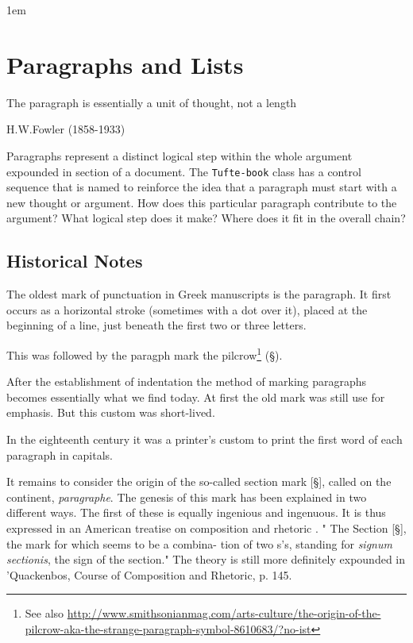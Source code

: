 \parindent1em
          
\chapter{Paragraphs and Lists}

\epigraph{The paragraph is essentially a unit of thought, not a length}{H.W.Fowler (1858-1933)}

\noindent Paragraphs represent a distinct logical step within the whole argument expounded in section of a document. The \texttt{Tufte-book} class has a control sequence that is named \cmd{\newthought} to reinforce the idea that a paragraph must start with a new thought or argument. How does this particular paragraph contribute to the argument? 
What logical step does it make? Where does it fit in the overall chain?

\section{Historical Notes}

The oldest mark of punctuation in Greek manuscripts is the paragraph. It first occurs as a horizontal stroke (sometimes with a dot over it), placed at the beginning of a line, just beneath the first two or three letters.

This was followed by the paragph mark the pilcrow\footnote{See also \protect\url{http://www.smithsonianmag.com/arts-culture/the-origin-of-the-pilcrow-aka-the-strange-paragraph-symbol-8610683/?no-ist}} (\S). 

After the establishment of indentation the method of marking paragraphs becomes essentially what we find today. At first the old mark was still use for emphasis. But this custom was short-lived.

In the eighteenth century it was a printer’s custom to print the first word of each paragraph in capitals. 

It remains to consider the origin of the so-called section 
mark [\S], called on the continent, \emph{paragraphe}. The genesis of 
this mark has been explained in two different ways. The first 
of these is equally ingenious and ingenuous. It is thus 
expressed in an American treatise on composition and rhetoric . 
" The Section [\S], the mark for which seems to be a combina- 
tion of two s's, standing for \emph{signum sectionis}, the sign of the 
section." The theory is still more definitely expounded  in 
'Quackenbos, Course of Composition and Rhetoric, p. 145. 


